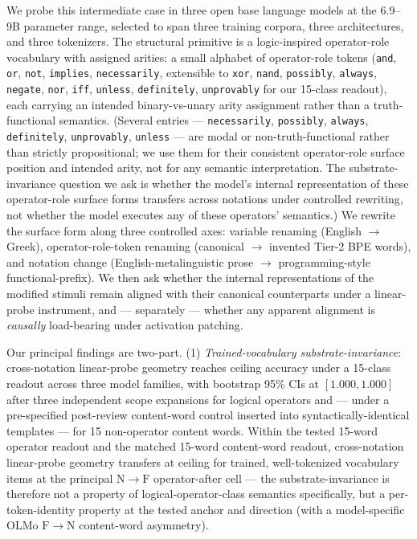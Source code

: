 \documentclass[11pt,letterpaper]{article}
\newcommand{\NtoF}{\ensuremath{\mathrm{N}\!\to\!\mathrm{F}}}
\newcommand{\FtoN}{\ensuremath{\mathrm{F}\!\to\!\mathrm{N}}}
\begin{document}
We probe this intermediate case in three open base language models at
the 6.9--9B parameter range, selected to span three training corpora,
three architectures, and three tokenizers. The structural primitive is
a logic-inspired operator-role vocabulary with assigned arities: a
small alphabet of operator-role tokens (\texttt{and}, \texttt{or},
\texttt{not}, \texttt{implies}, \texttt{necessarily}, extensible to
\texttt{xor}, \texttt{nand}, \texttt{possibly}, \texttt{always},
\texttt{negate}, \texttt{nor}, \texttt{iff}, \texttt{unless},
\texttt{definitely}, \texttt{unprovably} for our 15-class readout),
each carrying an intended binary-vs-unary arity assignment rather than
a truth-functional semantics. (Several entries --- \texttt{necessarily},
\texttt{possibly}, \texttt{always}, \texttt{definitely},
\texttt{unprovably}, \texttt{unless} --- are modal or
non-truth-functional rather than strictly propositional; we use them
for their consistent operator-role surface position and intended
arity, not for any semantic interpretation. The substrate-invariance
question we ask is whether the model's internal representation of
these operator-role surface forms transfers across notations under
controlled rewriting, not whether the model executes any of these
operators' semantics.) We rewrite the surface form along three
controlled axes: variable renaming (English $\to$ Greek),
operator-role-token renaming (canonical $\to$ invented Tier-2 BPE
words), and notation change (English-metalinguistic prose $\to$
programming-style functional-prefix). We then ask whether the internal
representations of the modified stimuli remain aligned with their
canonical counterparts under a linear-probe instrument, and ---
separately --- whether any apparent alignment is \emph{causally}
load-bearing under activation patching.

Our principal findings are two-part. (1) \emph{Trained-vocabulary
substrate-invariance}: cross-notation linear-probe geometry reaches
ceiling accuracy under a 15-class readout across three model families,
with bootstrap 95\% CIs at $[1.000, 1.000]$ after three independent
scope expansions for logical operators and --- under a pre-specified
post-review content-word control inserted into syntactically-identical
templates --- for 15 non-operator content words. Within the tested
15-word operator readout and the matched 15-word content-word readout,
cross-notation linear-probe geometry transfers at ceiling for trained,
well-tokenized vocabulary items at the principal \NtoF{}
operator-after cell --- the substrate-invariance is therefore not a
property of logical-operator-class semantics specifically, but a
per-token-identity property at the tested anchor and direction (with a
model-specific OLMo \FtoN{} content-word asymmetry).
\end{document}

